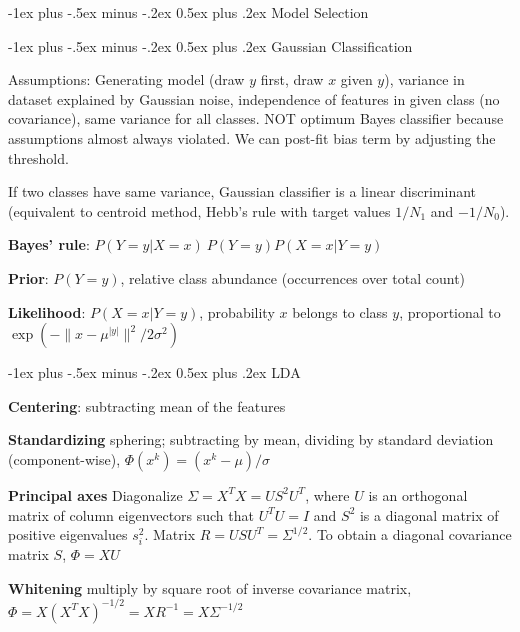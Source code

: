 \documentclass[10pt,landscape]{article}
\makeatletter
\renewcommand{\section}{\@startsection{section}{1}{0mm}%
                                {-1ex plus -.5ex minus -.2ex}%
                                {0.5ex plus .2ex}%
                                {\normalfont\large\bfseries}}
\makeatother
\begin{document}
\begin{multicols}{3}
\section{Model Selection}


\section{Gaussian Classification}

Assumptions: Generating model (draw $y$ first, draw $x$ given $y$), variance in dataset explained by Gaussian noise, independence of features in given class (no covariance), same variance for all classes. NOT optimum Bayes classifier because assumptions almost always violated. We can post-fit bias term by adjusting the threshold.

If two classes have same variance, Gaussian classifier is a linear discriminant (equivalent to centroid method, Hebb's rule with target values $1/N_1$ and $-1/N_0$).

\textbf{Bayes' rule}: $P(Y=y | X=x) ~ P(Y=y)P(X=x | Y=y)$

\textbf{Prior}: $P(Y=y)$, relative class abundance (occurrences over total count)

\textbf{Likelihood}: $P(X=x|Y=y)$, probability $x$ belongs to class $y$, proportional to $\exp(-\lVert x - \mu^{|y|} \rVert^2 / 2\sigma^2)$


\section{LDA}

\textbf{Centering}: subtracting mean of the features

\textbf{Standardizing} sphering; subtracting by mean, dividing by standard deviation (component-wise), $\Phi(x^k) = (x^k - \mu) / \sigma$

\textbf{Principal axes} Diagonalize $\Sigma = X^T X = US^2 U^T$, where $U$ is an orthogonal matrix of column eigenvectors such that $U^T U = I$ and $S^2$ is a diagonal matrix of positive eigenvalues $s_i^2$. Matrix $R = USU^T = \Sigma^{1/2}$. To obtain a diagonal covariance matrix $S$, $\Phi = XU$

\textbf{Whitening} multiply by square root of inverse covariance matrix, $\Phi = X(X^T X)^{-1/2} = XR^{-1} = X\Sigma^{-1/2}$


\end{multicols}
\end{document}
